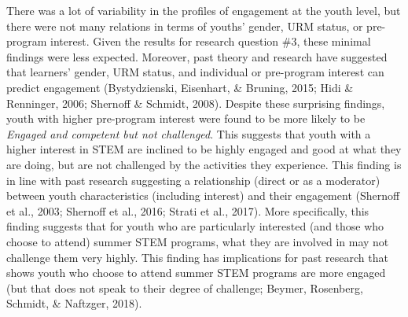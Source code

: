 \documentclass[]{msu-thesis}
\theoremstyle{definition}
\theoremstyle{definition}
\theoremstyle{definition}
\theoremstyle{remark}
\begin{document}
There was a lot of variability in the profiles of engagement at the
youth level, but there were not many relations in terms of youths'
gender, URM status, or pre-program interest. Given the results for
research question \#3, these minimal findings were less expected.
Moreover, past theory and research have suggested that learners' gender,
URM status, and individual or pre-program interest can predict
engagement (Bystydzienski, Eisenhart, \& Bruning, 2015; Hidi \&
Renninger, 2006; Shernoff \& Schmidt, 2008). Despite these surprising
findings, youth with higher pre-program interest were found to be more
likely to be \emph{Engaged and competent but not challenged}. This
suggests that youth with a higher interest in STEM are inclined to be
highly engaged and good at what they are doing, but are not challenged
by the activities they experience. This finding is in line with past
research suggesting a relationship (direct or as a moderator) between
youth characteristics (including interest) and their engagement
(Shernoff et al., 2003; Shernoff et al., 2016; Strati et al., 2017).
More specifically, this finding suggests that for youth who are
particularly interested (and those who choose to attend) summer STEM
programs, what they are involved in may not challenge them very highly.
This finding has implications for past research that shows youth who
choose to attend summer STEM programs are more engaged (but that does
not speak to their degree of challenge; Beymer, Rosenberg, Schmidt, \&
Naftzger, 2018).
\end{document}
